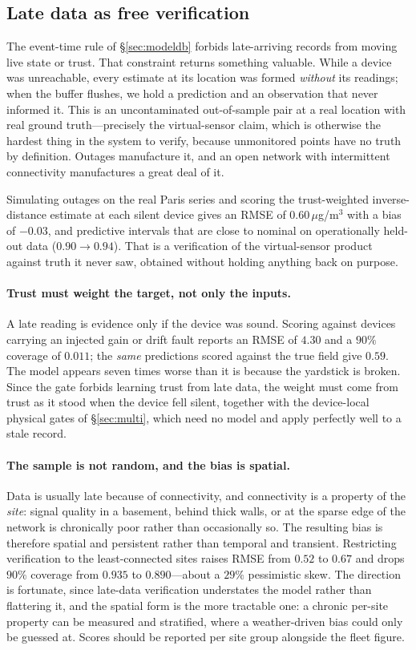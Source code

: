 \documentclass[10pt]{article}
\begin{document}
\subsection{Late data as free verification}
\label{sec:lateverif}
The event-time rule of \S\ref{sec:modeldb} forbids late-arriving records from
moving live state or trust. That constraint returns something valuable. While a
device was unreachable, every estimate at its location was formed \emph{without}
its readings; when the buffer flushes, we hold a prediction and an observation
that never informed it. This is an uncontaminated out-of-sample pair at a real
location with real ground truth---precisely the virtual-sensor claim, which is
otherwise the hardest thing in the system to verify, because unmonitored points
have no truth by definition. Outages manufacture it, and an open network with
intermittent connectivity manufactures a great deal of it.

Simulating outages on the real Paris series and scoring the trust-weighted
inverse-distance estimate at each silent device gives an RMSE of
$0.60$\,$\mu$g/m$^3$ with a bias of $-0.03$, and predictive intervals that are
close to nominal on operationally held-out data ($0.90\!\to\!0.94$). That is a
verification of the virtual-sensor product against truth it never saw, obtained
without holding anything back on purpose.

\paragraph{Trust must weight the target, not only the inputs.}
A late reading is evidence only if the device was sound. Scoring against devices
carrying an injected gain or drift fault reports an RMSE of $4.30$ and a $90\%$
coverage of $0.011$; the \emph{same} predictions scored against the true field
give $0.59$. The model appears seven times worse than it is because the yardstick
is broken. Since the gate forbids learning trust from late data, the weight must
come from trust as it stood when the device fell silent, together with the
device-local physical gates of \S\ref{sec:multi}, which need no model and apply
perfectly well to a stale record.

\paragraph{The sample is not random, and the bias is spatial.}
Data is usually late because of connectivity, and connectivity is a property of
the \emph{site}: signal quality in a basement, behind thick walls, or at the
sparse edge of the network is chronically poor rather than occasionally so. The
resulting bias is therefore spatial and persistent rather than temporal and
transient. Restricting verification to the least-connected sites raises RMSE from
$0.52$ to $0.67$ and drops $90\%$ coverage from $0.935$ to $0.890$---about a
$29\%$ pessimistic skew. The direction is fortunate, since late-data verification
understates the model rather than flattering it, and the spatial form is the more
tractable one: a chronic per-site property can be measured and stratified, where a
weather-driven bias could only be guessed at. Scores should be reported per site
group alongside the fleet figure.
\end{document}
